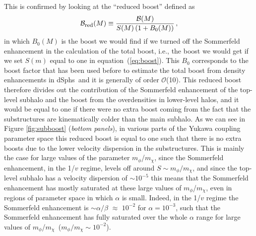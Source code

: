 \documentclass[aps,prd,twocolumn,amsmath,amssymb,floatfix,nofootinbib,10pt]{revtex4}
\newcommand{\ie}{i.e.}
\newcommand{\somm}{\ensuremath{S}}
\newcommand{\mdm}{\ensuremath{m_{\chi}}}
\newcommand{\mv}{\ensuremath{m_{\phi}}}
\newcommand{\eqnname}{equation}
\newcommand{\order}{\ensuremath{\mathcal{O}}}
\newcommand{\boost}{\ensuremath{B}}
\newcommand{\redboost}{\ensuremath{\mathcal{B}_{\mbox{{\footnotesize red}}}}}
\newcommand{\totalboost}{\ensuremath{\mathcal{B}}}
\newcommand{\dSphs}{dSphs}
\begin{document}
This is confirmed by looking at the ``reduced boost'' defined as
\begin{equation}\label{eq:redboost}
\redboost(M) \equiv \frac{\totalboost(M)}{\somm(M)\left(1+\boost_0(M)\right)}\, ,
\end{equation}
in which $\boost_0(M)$ is the boost we would find if we turned off the
Sommerfeld enhancement in the calculation of the total boost, \ie, the
boost we would get if we set $\somm(m)$ equal to one in \eqnname\
(\ref{eq:boost}). This $\boost_0$ corresponds to the boost factor that
has been used before to estimate the total boost from density
enhancements in \dSphs\ and it is generally of order \order(10). This
reduced boost therefore divides out the contribution of the Sommerfeld
enhancement of the top-level subhalo and the boost from the
overdensities in lower-level halos, and it would be equal to one if
there were no extra boost coming from the fact that the substructures
are kinematically colder than the main subhalo. As we can see in
Figure \ref{fig:subboost} (\emph{bottom panels}), in various parts of
the Yukawa coupling parameter space this reduced boost is equal to one
such that there is no extra boosts due to the lower velocity
dispersion in the substructures. This is mainly the case for large
values of the parameter \mv/\mdm, since the Sommerfeld enhancement, in
the 1/$v$ regime, levels off around $\somm \sim \mv/\mdm$, and since
the top-level subhalo has a velocity dispersion of $\sim 10^{-5}$ this
means that the Sommerfeld enhancement has mostly saturated at these
large values of \mv/\mdm, even in regions of parameter space in which
$\alpha$ is small. Indeed, in the 1/$v$ regime the Sommerfeld
enhancement is $\sim \alpha/\beta$ $\approx$ $10^{-2}$ for $\alpha =
10^{-3}$, such that the Sommerfeld enhancement has fully saturated
over the whole $\alpha$ range for large values of \mv/\mdm\ ($\mv/\mdm
\sim 10^{-2}$). 
\end{document}
